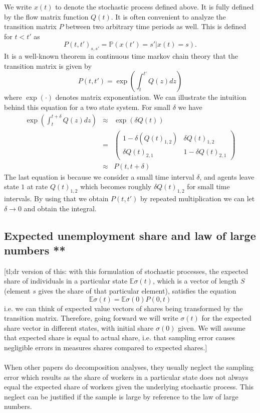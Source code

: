 We write $x(t)$ to denote the stochastic process defined above. It is fully defined by the flow matrix function $Q(t)$. It is often convenient to analyze the transition matrix $P$ between two arbitrary time periods as well. This is defined for $t<t'$ as
\[
P(t,t')_{s,s'} = \mathbb{P}(x(t')=s'|x(t)=s).
\]
It is a well-known theorem in continuous time markov chain theory that the transition matrix is given by
\[
P(t,t') = \exp\left(\int_{t}^{t'} Q(z)dz\right)
\]
where $\exp(\cdot)$ denotes matrix exponentiation. We can illustrate the intuition behind this equation for a two state system. For small $\delta$ we have
\begin{eqnarray*}
	\exp\left(\int_{t}^{t+\delta} Q(z)dz\right)&\approx & \exp\left(\delta Q(t)\right) \\
	&=& \left(\begin{array}{cc}
	1-\delta(Q(t)_{1,2}) & \delta Q(t)_{1,2}\\
	\delta Q(t)_{2,1} & 1-\delta Q(t)_{2,1}
\end{array}\right)	 \\
&\approx & P(t,t+\delta)
\end{eqnarray*}
The last equation is because we consider a small time interval $\delta$, and agents leave state $1$ at rate $Q(t)_{1,2}$ which becomes roughly $\delta Q(t)_{1,2}$ for small time intervals. By using that we obtain $P(t,t')$ by repeated multiplication we can let $\delta\to 0$ and obtain the integral.
\subsection{Expected unemployment share and law of large numbers **}
[tl;dr version of this: with this formulation of stochastic processes, the expected share of individuals in a particular state $\mathbb{E}\sigma(t)$, which is a vector of length $S$ (element $s$ gives the share of that particular element), satisfies the equation
\[
\mathbb{E}\sigma(t) = \mathbb{E}\sigma(0)P(0,t)
\]
i.e. we can think of expected value vectors of shares being transformed by the transition matrix. Therefore, going forward we will write $\sigma(t)$ for the expected share vector in different states, with initial share $\sigma(0)$ given. We will assume that expected share is equal to actual share, i.e. that sampling error causes negligible errors in measures shares compared to expected shares.]\\\\

When other papers do decomposition analyses, they usually neglect the sampling error which results as the share of workers in a particular state does not always equal the expected share of workers given the underlying stochastic process. This neglect can be justified if the sample is large by reference to the law of large numbers.

